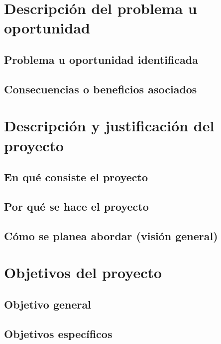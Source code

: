 \section{Descripción del problema u oportunidad}
\subsection{Problema u oportunidad identificada}
\subsection{Consecuencias o beneficios asociados}

\section{Descripción y justificación del proyecto}
\subsection{En qué consiste el proyecto}
\subsection{Por qué se hace el proyecto}
\subsection{Cómo se planea abordar (visión general)}

\section{Objetivos del proyecto}
\subsection{Objetivo general}
\subsection{Objetivos específicos}

